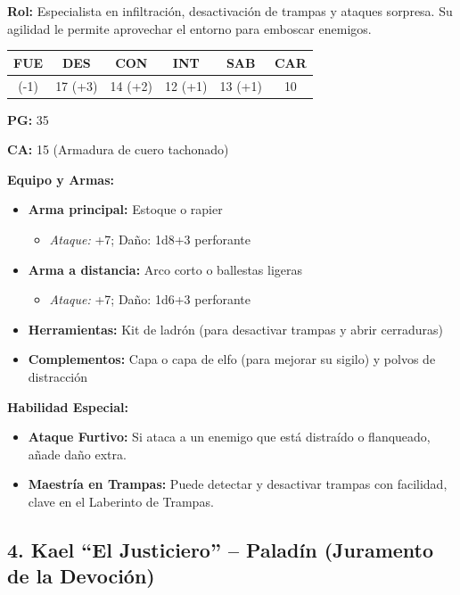 \documentclass[
  twocolumn]{article}
\providecommand{\tightlist}{%
  \setlength{\itemsep}{0pt}\setlength{\parskip}{0pt}}
\begin{document}
\textbf{Rol:} Especialista en infiltración, desactivación de trampas y
ataques sorpresa. Su agilidad le permite aprovechar el entorno para
emboscar enemigos.

\begin{longtable}[]{@{}cccccc@{}}
\toprule\noalign{}
FUE & DES & CON & INT & SAB & CAR \\
\midrule\noalign{}
\endhead
\bottomrule\noalign{}
\endlastfoot
8 (-1) & 17 (+3) & 14 (+2) & 12 (+1) & 13 (+1) & 10 \\
\end{longtable}

\textbf{PG:} 35

\textbf{CA:} 15 (Armadura de cuero tachonado)

\textbf{Equipo y Armas:}

\begin{itemize}
\tightlist
\item
  \textbf{Arma principal:} Estoque o rapier

  \begin{itemize}
  \tightlist
  \item
    \emph{Ataque:} +7; Daño: 1d8+3 perforante
  \end{itemize}
\item
  \textbf{Arma a distancia:} Arco corto o ballestas ligeras

  \begin{itemize}
  \tightlist
  \item
    \emph{Ataque:} +7; Daño: 1d6+3 perforante
  \end{itemize}
\item
  \textbf{Herramientas:} Kit de ladrón (para desactivar trampas y abrir
  cerraduras)
\item
  \textbf{Complementos:} Capa o capa de elfo (para mejorar su sigilo) y
  polvos de distracción
\end{itemize}

\textbf{Habilidad Especial:}

\begin{itemize}
\tightlist
\item
  \textbf{Ataque Furtivo:} Si ataca a un enemigo que está distraído o
  flanqueado, añade daño extra.
\item
  \textbf{Maestría en Trampas:} Puede detectar y desactivar trampas con
  facilidad, clave en el Laberinto de Trampas.
\end{itemize}

\subsection{4. Kael ``El Justiciero'' -- Paladín (Juramento de la
Devoción)}\label{kael-el-justiciero-paladuxedn-juramento-de-la-devociuxf3n}
\end{document}
